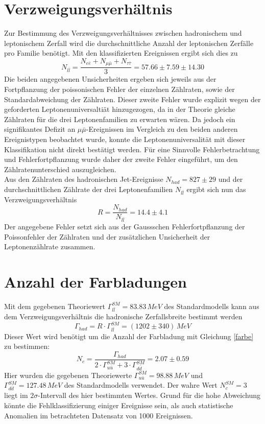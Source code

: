 \documentclass{include/thesisclass3}
\newcommand{\cc}{\cdot}
\newcommand{\e}[1]{\,\si{#1}}
\begin{document}
\section{Verzweigungsverhältnis}
Zur Bestimmung des Verzweigungsverhältnisses zwischen hadronischem und leptonischem Zerfall wird die durchschnittliche Anzahl der leptonischen Zerfälle pro Familie benötigt. Mit den klassifizierten Ereignissen ergibt sich dies zu
\[ N_{l \bar l} = \frac{N_{e\bar e} + N_{\mu \bar\mu} + N_{\tau \bar \tau}}{3} = 57.66 \pm 7.59 \pm 14.30\]
Die beiden angegebenen Unsicherheiten ergeben sich jeweils aus der Fortpflanzung der poissonischen Fehler der einzelnen Zählraten, sowie der Standardabweichung der Zählraten. 
Dieser zweite Fehler wurde explizit wegen der geforderten Leptonenuniversaltiät hinzugezogen, da in der Theorie gleiche Zählraten für die drei Leptonenfamilien zu erwarten wären.
Da jedoch ein signifikantes Defizit an $\mu \bar \mu$-Ereignissen im Vergleich zu den beiden anderen Ereignistypen beobachtet wurde, konnte die Leptonenuniversalität mit dieser Klassifikation nicht direkt bestätigt werden.
Für eine Sinnvolle Fehlerbetrachtung und Fehlerfortpflanzung wurde daher der zweite Fehler eingeführt, um den Zählratenunterschied auszugleichen.\\
Aus den Zählraten des hadronischen Jet-Ereignisse $N_{had} = 827\pm 29$ und der durchschnittlichen Zählrate der drei Leptonenfamilien $N_{l \bar l}$ ergibt sich nun das Verzweigungsverhältnis
\[ 
R = \frac{ N_{had}}{N_{l \bar l}} = 14.4 \pm 4.1\]
Der angegebene Fehler setzt sich aus der Gaussschen Fehlerfortpflanzung der Poissonfehler der Zählraten und der zusätzlichen Unsicherheit der Leptonenzählrate zusammen.

\section{Anzahl der Farbladungen}
Mit dem gegebenen Theoriewert $\Gamma^{SM}_{l \bar l} = 83.83\e{MeV}$ des Standardmodells kann aus dem Verzweigungsverhältnis die hadronische Zerfallsbreite bestimmt werden
\[\Gamma_{had} = R \cc \Gamma^{SM}_{l \bar l} =  (1202 \pm 340)\e{MeV}\]
Dieser Wert wird benötigt um die Anzahl der Farbladung mit Gleichung \ref{farbe} zu bestimmen:
\[ N_c = \frac{\Gamma_{had}}{2\cc \Gamma^{SM}_{u\bar u} + 3 \cc \Gamma^{SM}_{d \bar d}} = 2.07 \pm 0.59\]
Hier wurden die gegebenen Theoriewerte $\Gamma_{u\bar u}^{SM}=98.88\e{MeV}$ und $\Gamma_{d \bar d}^{SM}=127.48\e{MeV}$ des Standardmodells verwendet. Der wahre Wert $N_c^{SM} = 3$ liegt im $2\sigma$-Intervall des hier bestimmten Wertes. Grund für die hohe Abweichung könnte die Fehlklassifizierung einiger Ereignisse sein, als auch statistische Anomalien im betrachteten Datensatz von 1000 Ereignissen.
\end{document}
